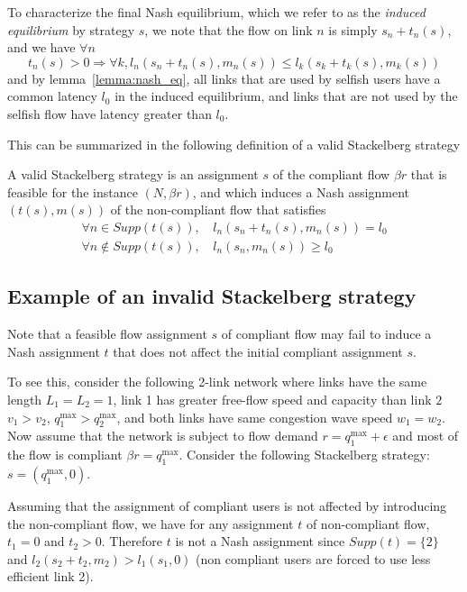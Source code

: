 To characterize the final Nash equilibrium, which we refer to as the \emph{induced equilibrium} by strategy $s$, we note that the flow on link $n$ is simply $s_n + t_n(s)$, and we have $\forall n$
\[
t_n(s) > 0 \Rightarrow \forall k, l_n \left( s_n + t_n(s), m_n(s) \right) \leq l_k \left( s_k + t_k(s), m_k(s) \right)
\]
and by lemma~\ref{lemma:nash_eq}, all links that are used by selfish users have a common latency $l_0$ in the induced equilibrium, and links that are not used by the selfish flow have latency greater than $l_0$.

This can be summarized in the following definition of a valid Stackelberg strategy


\begin{definition}
A valid Stackelberg strategy is an assignment $s$ of the compliant flow $\beta r$ that is feasible for the instance $(N, \beta r)$, and which induces a Nash assignment $(t(s), m(s))$ of the non-compliant flow that satisfies
\begin{align*}
\forall n \in Supp \left( t(s) \right),\, &l_n \left( s_n + t_n(s), m_n(s) \right) = l_0 \\
\forall n \notin Supp \left( t(s) \right),\, &l_n \left( s_n, m_n(s) \right) \geq l_0
\end{align*}
\end{definition}


\subsection{Example of an invalid Stackelberg strategy} Note that a feasible flow assignment $s$ of compliant flow may fail to induce a Nash assignment $t$ that does not affect the initial compliant assignment $s$.

To see this, consider the following 2-link network where links have the same length $L_1 = L_2 = 1$, link 1 has greater free-flow speed and capacity than link $2$ $v_1 > v_2$, $q_1^{\max} > q_2^{\max}$, and both links have same congestion wave speed $w_1 = w_2$.
Now assume that the network is subject to flow demand $r = q_1^{\max} + \epsilon$ and most of the flow is compliant $\beta r = q_1^{\max}$. Consider the following Stackelberg strategy: $s = (q_1^{\max}, 0)$.

Assuming that the assignment of compliant users is not affected by introducing the non-compliant flow, we have for any assignment $t$ of non-compliant flow, $t_1 = 0$ and $t_2 > 0$. Therefore $t$ is not a Nash assignment since $Supp(t) = \{ 2 \}$ and $l_2(s_2 + t_2, m_2) > l_1(s_1, 0)$ (non compliant users are forced to use less efficient link 2).

